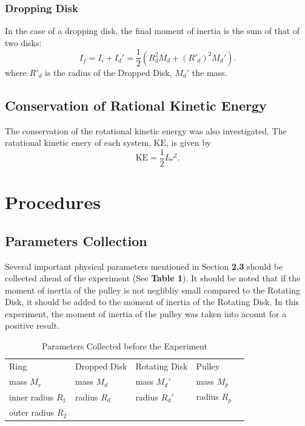 \subsubsection{Dropping Disk}
In the case of a dropping disk, the final moment of inertia is the sum of that of two disks:
$$
I_f = I_i + I_d'= \frac12(R_d^2M_d+(R'_d)^2M_d').
$$
where $R'_d$ is the radius of the Dropped Disk, $M_d'$ the mass.
\subsection{Conservation of Rational Kinetic Energy}
The conservation of the rotational kinetic energy was also investigated. The ratational kinetic enery of each system, $\text{KE}$, is given by
$$
\text{KE} = \frac{1}{2}I\omega^2.
$$
\section{Procedures}
\subsection{Parameters Collection}
Several important physical parameters mentioned in Section \textbf{2.3} should be collected ahead of the experiment (See \textbf{Table 1}). It should be noted that if the moment of inertia of the pulley is not neglibliy small compared to the Rotating Disk, it should be added to the moment of inertia of the Rotating Disk. In this experiment, the moment of inertia of the pulley was taken into acount for a positive result.

\begin{table}[!htb]
	\centering
	\begin{tabular}{@{}lllll@{}}
		\cmidrule(r){1-4}
		Ring & Dropped Disk & Rotating Disk & Pulley &  \\ \cmidrule(r){1-4}
		\multicolumn{1}{l|}{mass $M_r$} & \multicolumn{1}{l|}{mass $M_d$} & \multicolumn{1}{l|}{mass $M_d'$} & mass $M_p$ &  \\
		\multicolumn{1}{l|}{inner radius $R_1$} & \multicolumn{1}{l|}{radius $R_d$} & \multicolumn{1}{l|}{radius $R_d'$} & radius $R_p$ &  \\
		\multicolumn{1}{l|}{outer radius $R_2$} & \multicolumn{1}{l|}{} & \multicolumn{1}{l|}{} &  &  \\ \cmidrule(r){1-4}
	\end{tabular}
\caption{Parameters Collected before the Experiment}
\end{table}

